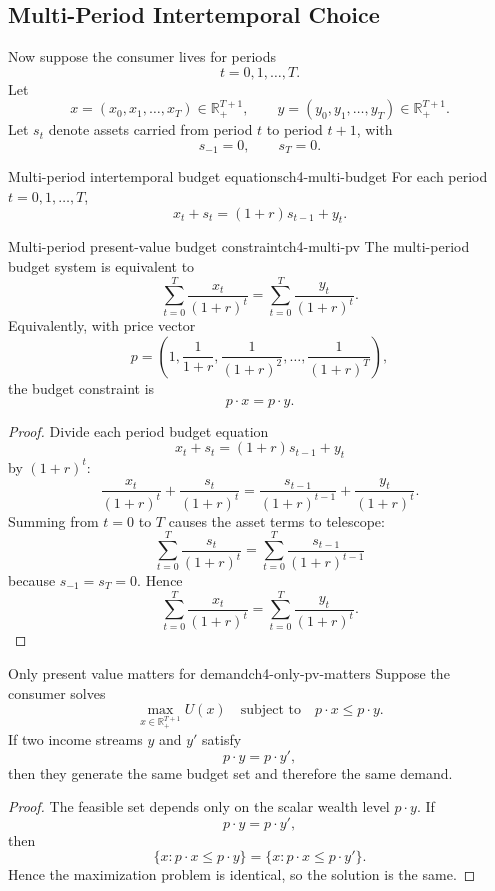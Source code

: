 \subsection{Multi-Period Intertemporal Choice}

Now suppose the consumer lives for periods
\[
t=0,1,\dots,T.
\]
Let
\[
x=(x_0,x_1,\dots,x_T)\in \mathbb{R}_+^{T+1},
\qquad
y=(y_0,y_1,\dots,y_T)\in \mathbb{R}_+^{T+1}.
\]
Let $s_t$ denote assets carried from period $t$ to period $t+1$, with
\[
s_{-1}=0, \qquad s_T=0.
\]

\begin{definition}{Multi-period intertemporal budget equations}{ch4-multi-budget}
For each period $t=0,1,\dots,T$,
\[
x_t+s_t=(1+r)s_{t-1}+y_t.
\]
\end{definition}

\begin{theorem}{Multi-period present-value budget constraint}{ch4-multi-pv}
The multi-period budget system is equivalent to
\[
\sum_{t=0}^{T}\frac{x_t}{(1+r)^t}
=
\sum_{t=0}^{T}\frac{y_t}{(1+r)^t}.
\]
Equivalently, with price vector
\[
p=\left(1,\frac{1}{1+r},\frac{1}{(1+r)^2},\dots,\frac{1}{(1+r)^T}\right),
\]
the budget constraint is
\[
p\cdot x = p\cdot y.
\]
\end{theorem}

\begin{proof}
Divide each period budget equation
\[
x_t+s_t=(1+r)s_{t-1}+y_t
\]
by $(1+r)^t$:
\[
\frac{x_t}{(1+r)^t}+\frac{s_t}{(1+r)^t}
=
\frac{s_{t-1}}{(1+r)^{t-1}}+\frac{y_t}{(1+r)^t}.
\]
Summing from $t=0$ to $T$ causes the asset terms to telescope:
\[
\sum_{t=0}^{T}\frac{s_t}{(1+r)^t}
=
\sum_{t=0}^{T}\frac{s_{t-1}}{(1+r)^{t-1}}
\]
because $s_{-1}=s_T=0$. Hence
\[
\sum_{t=0}^{T}\frac{x_t}{(1+r)^t}
=
\sum_{t=0}^{T}\frac{y_t}{(1+r)^t}.
\]
\end{proof}

\begin{theorem}{Only present value matters for demand}{ch4-only-pv-matters}
Suppose the consumer solves
\[
\max_{x\in \mathbb{R}_+^{T+1}} U(x)
\quad \text{subject to} \quad
p\cdot x \le p\cdot y.
\]
If two income streams $y$ and $y'$ satisfy
\[
p\cdot y = p\cdot y',
\]
then they generate the same budget set and therefore the same demand.
\end{theorem}

\begin{proof}
The feasible set depends only on the scalar wealth level $p\cdot y$. If
\[
p\cdot y = p\cdot y',
\]
then
\[
\{x : p\cdot x \le p\cdot y\}
=
\{x : p\cdot x \le p\cdot y'\}.
\]
Hence the maximization problem is identical, so the solution is the same.
\end{proof}

